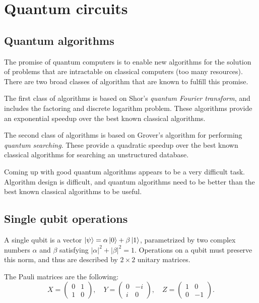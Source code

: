 \chapter{Quantum circuits}

\section{Quantum algorithms}
The promise of quantum computers is to enable new algorithms for the solution of problems that are intractable on classical computers (too many resources).
There are two broad classes of algorithm that are known to fulfill this promise.

The first class of algorithms is based on Shor's \emph{quantum Fourier transform},
and includes the factoring and discrete logarithm problem.
These algorithms provide an exponential speedup over the best known classical algorithms.

The second class of algorithms is based on Grover's algorithm for performing \emph{quantum searching}.
These provide a quadratic speedup over the best known classical algorithms for searching an unstructured database.

Coming up with good quantum algorithms appears to be a very difficult task.
Algorithm design is difficult,
and quantum algorithms need to be better than the best known classical algorithms to be useful.

\section{Single qubit operations}
A single qubit is a vector $\ket{\psi} = \alpha\ket{0} + \beta\ket{1}$, parametrized by two complex numbers $\alpha$ and $\beta$ satisfying $|\alpha|^2 + |\beta|^2 = 1$.
Operations on a qubit must preserve this norm, and thus are described by $2 \times 2$ unitary matrices.

The Pauli matrices are the following:
\[
    X = \begin{pmatrix}
        0 & 1 \\
        1 & 0
    \end{pmatrix},\quad
    Y = \begin{pmatrix}
        0 & -i \\
        i & 0
    \end{pmatrix},\quad
    Z = \begin{pmatrix}
        1 & 0 \\
        0 & -1
    \end{pmatrix}.
\]

